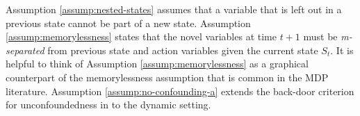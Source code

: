 \documentclass[12pt,a4paper]{article}
\theoremstyle{definition}
\newcommand{\ingraph}[1]{~\textnormal{\bf in}\,#1}
\newcommand{\textnot}{\textnormal{\bf not}~}
\DeclareMathOperator{\gG}{\mathscr{G}}
\begin{document}
Assumption \ref{assump:nested-states} assumes that a variable that is
left out in a previous state cannot be part of a new state.
Assumption \ref{assump:memorylessness} states that the novel variables
at time $t+1$ must be \emph{m-separated} from previous state and
action variables given the current state $S_t$. It is helpful to think
of Assumption \ref{assump:memorylessness} as a graphical counterpart
of the memorylessness assumption that is common in the MDP
literature. %
Assumption \ref{assump:no-confounding-a} extends the back-door
criterion for unconfoundedness in \textcite{pearl1993} to the dynamic
setting. %
\end{document}
